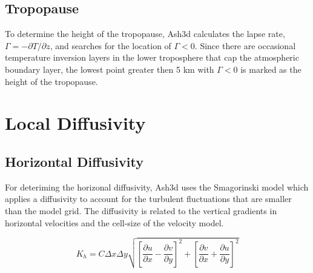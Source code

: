 \subsection{Tropopause}
To determine the height of the tropopause, Ash3d calculates the lapse rate,
$\Gamma = -\partial T/\partial z$, and searches for the location of $\Gamma<0$.
Since there are occasional temperature inversion layers in the lower troposphere
that cap the atmospheric boundary layer,
the lowest point greater then 5 $\mathrm{km}$ with $\Gamma<0$ is marked as the
height of the tropopause.





\section{Local Diffusivity}
\subsection{Horizontal Diffusivity}\label{ChapAppendVarDiff_Sec_Kh}
For deteriming the horizonal diffusivity, Ash3d uses the Smagorinski model which
applies a diffusivity to account for the turbulent fluctuations that are smaller
than the model grid. The diffusivity is related to the vertical gradients in
horizontal velocities and the cell-size of the velocity model.

\begin{equation}
K_h = C \Delta x \Delta y \sqrt{\left[ \frac{\partial u}{\partial x} -\frac{\partial v}{\partial y} \right]^2
+ \left[ \frac{\partial v}{\partial x} +\frac{\partial u}{\partial y} \right]^2}
\end{equation}

